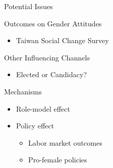 \documentclass[
  10pt,
  ignorenonframetext,
  aspectratio=43,
]{beamer}
\providecommand{\tightlist}{%
  \setlength{\itemsep}{0pt}\setlength{\parskip}{0pt}}
\begin{document}
\begin{frame}{Potential Issues}
\begin{block}{Outcomes on Gender Attitudes}
\protect\hypertarget{outcomes-on-gender-attitudes}{}
\begin{itemize}
\tightlist
\item
  Taiwan Social Change Survey
\end{itemize}
\end{block}

\begin{block}{Other Influencing Channels}
\protect\hypertarget{other-influencing-channels}{}
\begin{itemize}
\tightlist
\item
  Elected or Candidacy?
\end{itemize}
\end{block}

\begin{block}{Mechanisms}
\protect\hypertarget{mechanisms}{}
\begin{itemize}
\tightlist
\item
  Role-model effect
\item
  Policy effect

  \begin{itemize}
  \tightlist
  \item
    Labor market outcomes
  \item
    Pro-female policies
  \end{itemize}
\end{itemize}
\end{block}
\end{frame}
\end{document}
